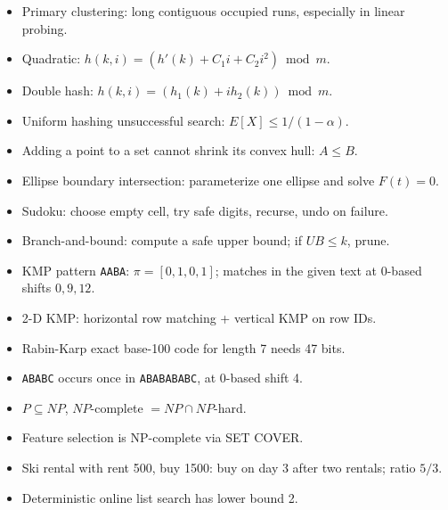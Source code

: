 \documentclass[11pt,a4paper]{article}
\begin{document}
\begin{pointbox}[Hashing]
\begin{itemize}[leftmargin=1.5em]
\item Primary clustering: long contiguous occupied runs, especially in linear probing.
\item Quadratic: \(h(k,i)=(h'(k)+C_1i+C_2i^2)\bmod m\).
\item Double hash: \(h(k,i)=(h_1(k)+i h_2(k))\bmod m\).
\item Uniform hashing unsuccessful search: \(E[X]\le1/(1-\alpha)\).
\end{itemize}
\end{pointbox}

\begin{pointbox}
\begin{itemize}[leftmargin=1.5em]
\item Adding a point to a set cannot shrink its convex hull: \(A\le B\).
\item Ellipse boundary intersection: parameterize one ellipse and solve \(F(t)=0\).
\item Sudoku: choose empty cell, try safe digits, recurse, undo on failure.
\item Branch-and-bound: compute a safe upper bound; if \(UB\le k\), prune.
\end{itemize}
\end{pointbox}

\begin{pointbox}
\begin{itemize}[leftmargin=1.5em]
\item KMP pattern \texttt{AABA}: \(\pi=[0,1,0,1]\); matches in the given text at 0-based shifts \(0,9,12\).
\item 2-D KMP: horizontal row matching + vertical KMP on row IDs.
\item Rabin-Karp exact base-100 code for length 7 needs 47 bits.
\item \texttt{ABABC} occurs once in \texttt{ABABABABC}, at 0-based shift 4.
\end{itemize}
\end{pointbox}

\begin{pointbox}
\begin{itemize}[leftmargin=1.5em]
\item \(P\subseteq NP\), \(NP\)-complete \(=NP\cap NP\)-hard.
\item Feature selection is NP-complete via SET COVER.
\item Ski rental with rent 500, buy 1500: buy on day 3 after two rentals; ratio \(5/3\).
\item Deterministic online list search has lower bound 2.
\end{itemize}
\end{pointbox}
\end{document}
